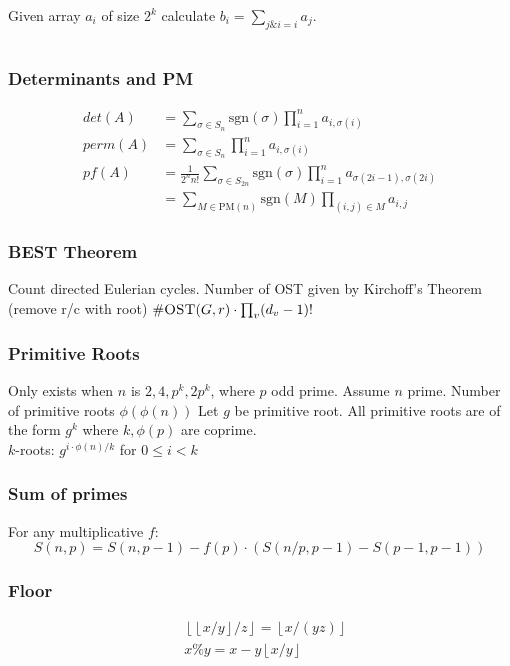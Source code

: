 \documentclass[8pt,a4paper,landscape,oneside]{amsart}
\newcommand{\code}[1]{\inputminted[fontsize=\normalsize,baselinestretch=1,breaklines,tabsize=2]{cpp}{code/#1}}
\newcommand*\BitAnd{\mathrel{\&}}
\begin{document}
\begin{multicols*}{3}
                Given array $a_i$ of size $2^k$ calculate $b_i = \sum_{j \BitAnd i = i} a_j$.
                \code{math/subset_conv.cpp}

            \subsubsection{Determinants and PM}
                \begin{align*}
                    det(A) &= \sum_{\sigma \in S_n}\text{sgn}(\sigma)\prod_{i = 1}^n a_{i,\sigma(i)}\\
                    perm(A) &= \sum_{\sigma \in S_n} \prod_{i = 1}^n a_{i,\sigma(i)}\\
                    pf(A) &= \frac{1}{2^nn!}\sum_{\sigma \in S_{2n}} \text{sgn}(\sigma)\prod_{i = 1}^n a_{\sigma(2i-1),\sigma(2i)}\\ &= \sum_{M \in \text{PM}(n)} \text{sgn}(M) \prod_{(i,j) \in M} a_{i,j}
                \end{align*}

            \subsubsection{BEST Theorem}
                Count directed Eulerian cycles. Number of OST given by
                Kirchoff's Theorem (remove r/c with root) $\#\textsc{OST}(G,r)
                \cdot \prod_{v}(d_v-1)!$

            \subsubsection{Primitive Roots}
                Only exists when $n$ is $2, 4, p^k, 2p^k$, where $p$ odd prime. Assume
                $n$ prime. Number of primitive roots $\phi(\phi(n))$
                Let $g$ be primitive root. All primitive roots are of the form $g^k$
                where $k,\phi(p)$ are coprime.\\ $k$-roots:
                $g^{i \cdot \phi(n) / k}$ for $0 \leq i < k$

            \subsubsection{Sum of primes} For any multiplicative $f$:
                \[
                    S(n,p) = S(n, p-1) - f(p) \cdot (S(n/p,p-1) - S(p-1,p-1))
                \]

            \subsubsection{Floor}
                \begin{align*}
                    &\left\lfloor \left\lfloor x/y \right\rfloor / z \right\rfloor = \left\lfloor x / (yz) \right\rfloor \\
                    &x \% y = x - y \left\lfloor x / y \right\rfloor
                \end{align*}




\end{multicols*}
\end{document}
